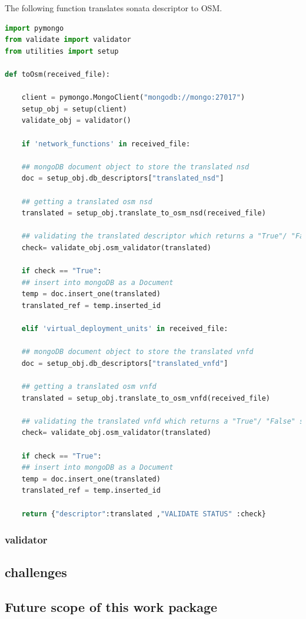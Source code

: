The following function translates sonata descriptor to OSM.
\begin{lstlisting}[language=Python]
import pymongo
from validate import validator
from utilities import setup

def toOsm(received_file):

	client = pymongo.MongoClient("mongodb://mongo:27017")
	setup_obj = setup(client)
	validate_obj = validator()
	
	if 'network_functions' in received_file:
	
	## mongoDB document object to store the translated nsd
	doc = setup_obj.db_descriptors["translated_nsd"]
	
	## getting a translated osm nsd
	translated = setup_obj.translate_to_osm_nsd(received_file)
	
	## validating the translated descriptor which returns a "True"/ "False" string
	check= validate_obj.osm_validator(translated)
	
	if check == "True":
	## insert into mongoDB as a Document
	temp = doc.insert_one(translated)
	translated_ref = temp.inserted_id
	
	elif 'virtual_deployment_units' in received_file:
	
	## mongoDB document object to store the translated vnfd
	doc = setup_obj.db_descriptors["translated_vnfd"]
	
	## getting a translated osm vnfd
	translated = setup_obj.translate_to_osm_vnfd(received_file)
	
	## validating the translated vnfd which returns a "True"/ "False" string
	check= validate_obj.osm_validator(translated)
	
	if check == "True":
	## insert into mongoDB as a Document
	temp = doc.insert_one(translated)
	translated_ref = temp.inserted_id
	
	return {"descriptor":translated ,"VALIDATE STATUS" :check}
\end{lstlisting}

\subsubsection{validator}

\subsection{challenges}

\subsection{Future scope of this work package}

